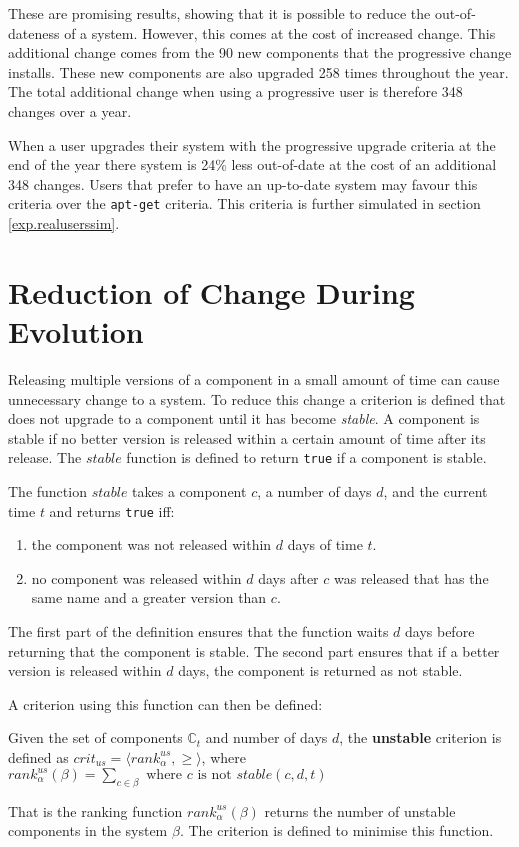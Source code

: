 These are promising results, showing that it is possible to reduce the out-of-dateness of a system.
However, this comes at the cost of increased change.
This additional change comes from the 90 new components that the progressive change installs.
These new components are also upgraded 258 times throughout the year.
The total additional change when using a progressive user is therefore 348 changes over a year.  

When a user upgrades their system with the progressive upgrade criteria at the end of the year there system is 24\% less out-of-date at the cost of an additional 348 changes.
Users that prefer to have an up-to-date system may favour this criteria over the \texttt{apt-get} criteria. 
This criteria is further simulated in section \ref{exp.realuserssim}.

\section{Reduction of Change During Evolution}
\label{exp.q3}
Releasing multiple versions of a component in a small amount of time can cause unnecessary change to a system.
To reduce this change a criterion is defined that does not upgrade to a component until it has become \textit{stable}.
A component is stable if no better version is released within a certain amount of time after its release.
The $stable$ function is defined to return \texttt{true} if a component is stable.
\begin{defs}
\label{exp.stablefunction}
The function $stable$ takes a component $c$, a number of days $d$, and the current time $t$ and returns \texttt{true} iff:
\begin{enumerate}
  \item the component was not released within $d$ days of time $t$.
  \item no component was released within $d$ days after $c$ was released that has the same name and a greater version than $c$.
\end{enumerate}
\end{defs}
The first part of the definition ensures that the function waits $d$ days before returning that the component is stable.
The second part ensures that if a better version is released within $d$ days, the component is returned as not stable.

A criterion using this function can then be defined:
\begin{defs}
	Given the set of components $\mathbb{C}_t$ and number of days $d$, the \textbf{unstable} criterion is defined as $crit_{us} = \langle rank^{us}_{\alpha}, \geq \rangle$,
	where \\$rank^{us}_{\alpha}(\beta) = \sum_{c \in \beta} \text{ where } c \text{ is not }stable(c,d,t)$
\end{defs}
That is the ranking function $rank^{us}_{\alpha}(\beta)$ returns the number of unstable components in the system $\beta$.
The criterion is defined to minimise this function. 


